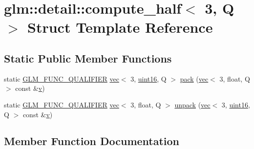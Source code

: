 \hypertarget{structglm_1_1detail_1_1compute__half_3_013_00_01_q_01_4}{}\section{glm\+:\+:detail\+:\+:compute\+\_\+half$<$ 3, Q $>$ Struct Template Reference}
\label{structglm_1_1detail_1_1compute__half_3_013_00_01_q_01_4}
\subsection*{Static Public Member Functions}
\begin{DoxyCompactItemize}
\item 
static \mbox{\hyperlink{setup_8hpp_a33fdea6f91c5f834105f7415e2a64407}{G\+L\+M\+\_\+\+F\+U\+N\+C\+\_\+\+Q\+U\+A\+L\+I\+F\+I\+ER}} \mbox{\hyperlink{structglm_1_1vec}{vec}}$<$ 3, \mbox{\hyperlink{namespaceglm_1_1detail_a47b2a7d006d187338e8031a352d1ce56}{uint16}}, Q $>$ \mbox{\hyperlink{structglm_1_1detail_1_1compute__half_3_013_00_01_q_01_4_a87afcb72dac066fcd514bbd8071980d8}{pack}} (\mbox{\hyperlink{structglm_1_1vec}{vec}}$<$ 3, float, Q $>$ const \&\mbox{\hyperlink{_s_d_l__opengl_8h_a10a82eabcb59d2fcd74acee063775f90}{v}})
\item 
static \mbox{\hyperlink{setup_8hpp_a33fdea6f91c5f834105f7415e2a64407}{G\+L\+M\+\_\+\+F\+U\+N\+C\+\_\+\+Q\+U\+A\+L\+I\+F\+I\+ER}} \mbox{\hyperlink{structglm_1_1vec}{vec}}$<$ 3, float, Q $>$ \mbox{\hyperlink{structglm_1_1detail_1_1compute__half_3_013_00_01_q_01_4_a888b7245229f861127dedbacf10e1568}{unpack}} (\mbox{\hyperlink{structglm_1_1vec}{vec}}$<$ 3, \mbox{\hyperlink{namespaceglm_1_1detail_a47b2a7d006d187338e8031a352d1ce56}{uint16}}, Q $>$ const \&\mbox{\hyperlink{_s_d_l__opengl_8h_a10a82eabcb59d2fcd74acee063775f90}{v}})
\end{DoxyCompactItemize}


\subsection{Member Function Documentation}
\mbox{\label{structglm_1_1detail_1_1compute__half_3_013_00_01_q_01_4_a87afcb72dac066fcd514bbd8071980d8}} 
